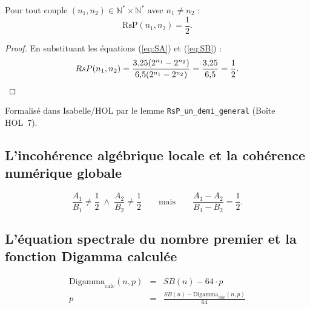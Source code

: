 \documentclass[]{pasj02}
\begin{document}
\begin{theorem}
  Pour tout couple $(n_1, n_2) \in \mathbb{N}^*\times\mathbb{N}^*$ avec
  $n_1 \neq n_2$ :
  \begin{equation}
    \mathrm{RsP}(n_1,n_2) = \frac{1}{2}.
  \end{equation}
\end{theorem}

\begin{proof}
  En substituant les équations (\ref{eq:SA}) et (\ref{eq:SB}) :
  \[
    \mathrm{RsP}(n_1,n_2)
    = \frac{3{,}25(2^{n_1}-2^{n_2})}{6{,}5(2^{n_1}-2^{n_2})}
    = \frac{3{,}25}{6{,}5} = \frac{1}{2}. \qedhere
  \]
\end{proof}

\noindent Formalisé dans Isabelle/HOL par le lemme
\texttt{RsP\_un\_demi\_general} (Boîte HOL~7).

\subsection{L'incohérence algébrique locale et la cohérence numérique
globale}
\label{ssec:incoherence}
\label{hol:incoherence_locale}

\begin{equation}
  \frac{A_1}{B_1} \neq \frac{1}{2}
  \;\wedge\;
  \frac{A_2}{B_2} \neq \frac{1}{2}
  \qquad\text{mais}\qquad
  \frac{A_1 - A_2}{B_1 - B_2} = \frac{1}{2}.
\end{equation}

\subsection{L'équation spectrale du nombre premier et la fonction Digamma
calculée}
\label{ssec:digamma}
\label{hol:digamma_equation}

\begin{eqnarray}
  \mathrm{Digamma}_{\mathrm{calc}}(n,p) &=& SB(n) - 64 \cdot p \\
  p &=& \frac{SB(n) - \mathrm{Digamma}_{\mathrm{calc}}(n,p)}{64}
\end{eqnarray}

\begin{table}
  \label{tab:digamma}
\end{table}
\end{document}
